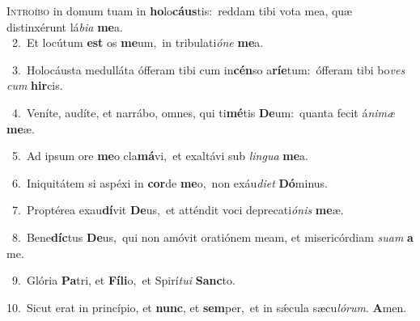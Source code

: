 \lettrine{\initial\textcolor{\initialcolor}{I}}{ntroíbo} in domum tuam in \textbf{ho}\-lo\-\textbf{cáus}\-tis:~\star reddam tibi vota mea, quæ distinxérunt lá\-\textit{bi}\-\textit{a} \textbf{me}\-a.\\
{\numbfont\textcolor{\numbcolor}{~2.}}~Et locútum \textbf{est} os \textbf{me}\-um,~\star in tribulati\-\textit{ó}\-\textit{ne} \textbf{me}\-a.\par
{\numbfont\textcolor{\numbcolor}{~3.}}~Holocáusta medulláta ófferam tibi cum in\-\textbf{cén}\-so a\-\textbf{rí}\-\textbf{e}tum:~\star ófferam tibi bo\textit{ves} \textit{cum} \textbf{hir}\-cis.\par
{\numbfont\textcolor{\numbcolor}{~4.}}~Veníte, audíte, et narrábo, omnes, qui ti\-\textbf{mé}\-tis \textbf{De}\-um:~\star quanta fecit á\-\textit{ni}\-\textit{mæ} \textbf{me}\-æ.\par
{\numbfont\textcolor{\numbcolor}{~5.}}~Ad ipsum ore \textbf{me}\-o cla\-\textbf{má}\-vi,~\star et exaltávi sub \textit{lin}\-\textit{gua} \textbf{me}\-a.\par
{\numbfont\textcolor{\numbcolor}{~6.}}~Iniquitátem si aspéxi in \textbf{cor}\-de \textbf{me}\-o,~\star non exáu\-\textit{di}\-\textit{et} \textbf{Dó}\-minus.\par
{\numbfont\textcolor{\numbcolor}{~7.}}~Proptérea exau\-\textbf{dí}\-vit \textbf{De}\-us,~\star et atténdit voci deprecati\-\textit{ó}\-\textit{nis} \textbf{me}\-æ.\par
{\numbfont\textcolor{\numbcolor}{~8.}}~Bene\-\textbf{díc}\-tus \textbf{De}\-us,~\star qui non amóvit oratiónem meam, et misericórdiam \textit{su}\-\textit{am} \textbf{a} me.\par
{\numbfont\textcolor{\numbcolor}{~9.}}~Glória \textbf{Pa}\-tri, et \textbf{Fí}\-\textbf{li}o,~\star et Spirí\-\textit{tu}\-\textit{i} \textbf{Sanc}\-to.\par
{\numbfont\textcolor{\numbcolor}{10.}}~Sicut erat in princípio, et \textbf{nunc}\-, et \textbf{sem}\-per,~\star et in sǽcula sæcu\-\textit{ló}\-\textit{rum}. \textbf{A}\-men.\par
